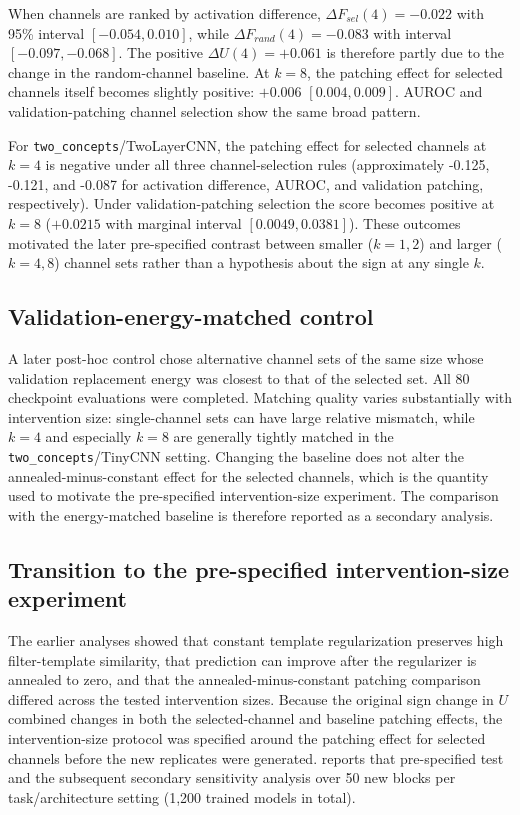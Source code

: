 When channels are ranked by activation difference, $\Delta F_{sel}(4)=-0.022$ with 95\% interval $[-0.054,0.010]$, while $\Delta F_{rand}(4)=-0.083$ with interval $[-0.097,-0.068]$. The positive $\Delta U(4)=+0.061$ is therefore partly due to the change in the random-channel baseline. At $k=8$, the patching effect for selected channels itself becomes slightly positive: $+0.006$ $[0.004,0.009]$. AUROC and validation-patching channel selection show the same broad pattern.

For \texttt{two\_concepts}/TwoLayerCNN, the patching effect for selected channels at $k=4$ is negative under all three channel-selection rules (approximately -0.125, -0.121, and -0.087 for activation difference, AUROC, and validation patching, respectively). Under validation-patching selection the score becomes positive at $k=8$ ($+0.0215$ with marginal interval $[0.0049,0.0381]$). These outcomes motivated the later pre-specified contrast between smaller ($k=1,2$) and larger ($k=4,8$) channel sets rather than a hypothesis about the sign at any single $k$.

\subsection{Validation-energy-matched control}\label{app:development-energy}

A later post-hoc control chose alternative channel sets of the same size whose validation replacement energy was closest to that of the selected set. All 80 checkpoint evaluations were completed. Matching quality varies substantially with intervention size: single-channel sets can have large relative mismatch, while $k=4$ and especially $k=8$ are generally tightly matched in the \texttt{two\_concepts}/TinyCNN setting. Changing the baseline does not alter the annealed-minus-constant effect for the selected channels, which is the quantity used to motivate the pre-specified intervention-size experiment. The comparison with the energy-matched baseline is therefore reported as a secondary analysis.

\subsection{Transition to the pre-specified intervention-size experiment}\label{app:transition}

The earlier analyses showed that constant template regularization preserves high filter-template similarity, that prediction can improve after the regularizer is annealed to zero, and that the annealed-minus-constant patching comparison differed across the tested intervention sizes. Because the original sign change in $U$ combined changes in both the selected-channel and baseline patching effects, the intervention-size protocol was specified around the patching effect for selected channels before the new replicates were generated.  reports that pre-specified test and the subsequent secondary sensitivity analysis over 50 new blocks per task/architecture setting (1,200 trained models in total).